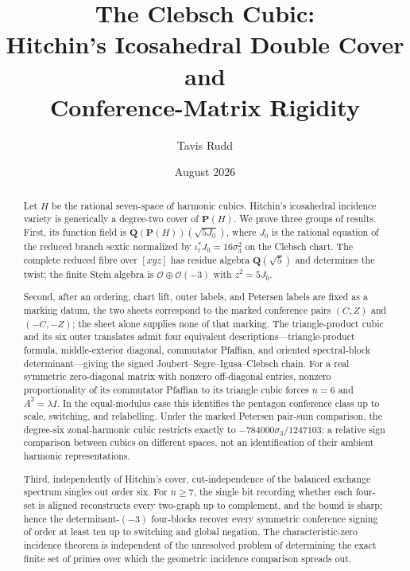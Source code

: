 \documentclass[11pt]{article}
\title{The Clebsch Cubic:\\
Hitchin's Icosahedral Double Cover and\\
Conference-Matrix Rigidity}
\author{Tavis Rudd}
\date{August 2026}
\theoremstyle{remark}
\newcommand{\Q}{\mathbf Q}
\begin{document}
\maketitle

\begin{abstract}
Let \(H\) be the rational seven-space of harmonic cubics.  Hitchin's
icosahedral incidence variety is generically a degree-two cover of
\(\mathbf P(H)\).  We prove three groups of results.  First, its function
field is
\(\Q(\mathbf P(H))(\sqrt{5J_0})\), where \(J_0\) is the rational equation
of the reduced branch sextic normalized by \(\iota_t^*J_0=16\sigma_3^2\)
on the Clebsch chart.  The complete reduced fibre over \([xyz]\) has
residue algebra \(\Q(\sqrt5)\) and determines the twist; the finite Stein
algebra is \(\mathcal O\oplus\mathcal O(-3)\) with \(z^2=5J_0\).

Second, after an ordering, chart lift, outer labels, and Petersen labels are
fixed as a marking datum, the two sheets correspond to the marked conference
pairs \((C,Z)\) and \((-C,-Z)\); the sheet alone supplies none of that marking.
The triangle-product cubic and its six outer translates admit four equivalent
descriptions---triangle-product formula, middle-exterior diagonal, commutator
Pfaffian, and oriented spectral-block determinant---giving the signed
Joubert--Segre--Igusa--Clebsch chain.  For a real symmetric zero-diagonal
matrix with nonzero off-diagonal entries, nonzero proportionality of its
commutator Pfaffian to its triangle cubic forces \(n=6\) and
\(A^2=\lambda I\).  In the equal-modulus case this identifies the pentagon
conference class up to scale, switching, and relabelling.  Under the marked
Petersen pair-sum comparison, the degree-six zonal-harmonic cubic restricts
exactly to
\(-784000\sigma_3/1247103\): a relative sign comparison between cubics on
different spaces, not an identification of their ambient harmonic
representations.

Third, independently of Hitchin's cover, cut-independence of the balanced
exchange spectrum singles out order six.  For \(n\geq7\), the single bit
recording whether each four-set is aligned reconstructs every two-graph up to
complement, and the bound is sharp; hence the determinant-\((-3)\) four-blocks
recover every symmetric conference signing of order at least ten up to
switching and global negation.  The characteristic-zero incidence theorem is
independent of the unresolved problem of determining the exact finite set of
primes over which the geometric incidence comparison spreads out.
\end{abstract}
\end{document}
